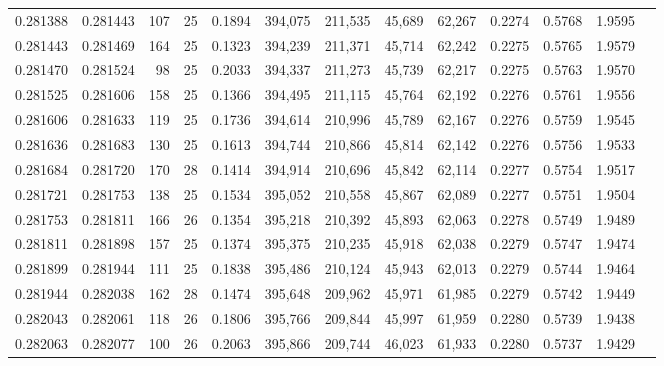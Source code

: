 \begin{tabular}{rrrrrrrrrrrrr}
0.281388 & 0.281443 &   107 &  25 &                                     0.1894 & 394,075 & 211,535 &  45,689 &  62,267 & 0.2274 & 0.5768 & 1.9595 \\
0.281443 & 0.281469 &   164 &  25 &                                     0.1323 & 394,239 & 211,371 &  45,714 &  62,242 & 0.2275 & 0.5765 & 1.9579 \\
0.281470 & 0.281524 &    98 &  25 &                                     0.2033 & 394,337 & 211,273 &  45,739 &  62,217 & 0.2275 & 0.5763 & 1.9570 \\
0.281525 & 0.281606 &   158 &  25 &                                     0.1366 & 394,495 & 211,115 &  45,764 &  62,192 & 0.2276 & 0.5761 & 1.9556 \\
0.281606 & 0.281633 &   119 &  25 &                                     0.1736 & 394,614 & 210,996 &  45,789 &  62,167 & 0.2276 & 0.5759 & 1.9545 \\
0.281636 & 0.281683 &   130 &  25 &                                     0.1613 & 394,744 & 210,866 &  45,814 &  62,142 & 0.2276 & 0.5756 & 1.9533 \\
0.281684 & 0.281720 &   170 &  28 &                                     0.1414 & 394,914 & 210,696 &  45,842 &  62,114 & 0.2277 & 0.5754 & 1.9517 \\
0.281721 & 0.281753 &   138 &  25 &                                     0.1534 & 395,052 & 210,558 &  45,867 &  62,089 & 0.2277 & 0.5751 & 1.9504 \\
0.281753 & 0.281811 &   166 &  26 &                                     0.1354 & 395,218 & 210,392 &  45,893 &  62,063 & 0.2278 & 0.5749 & 1.9489 \\
0.281811 & 0.281898 &   157 &  25 &                                     0.1374 & 395,375 & 210,235 &  45,918 &  62,038 & 0.2279 & 0.5747 & 1.9474 \\
0.281899 & 0.281944 &   111 &  25 &                                     0.1838 & 395,486 & 210,124 &  45,943 &  62,013 & 0.2279 & 0.5744 & 1.9464 \\
0.281944 & 0.282038 &   162 &  28 &                                     0.1474 & 395,648 & 209,962 &  45,971 &  61,985 & 0.2279 & 0.5742 & 1.9449 \\
0.282043 & 0.282061 &   118 &  26 &                                     0.1806 & 395,766 & 209,844 &  45,997 &  61,959 & 0.2280 & 0.5739 & 1.9438 \\
0.282063 & 0.282077 &   100 &  26 &                                     0.2063 & 395,866 & 209,744 &  46,023 &  61,933 & 0.2280 & 0.5737 & 1.9429 \\

\end{tabular}
